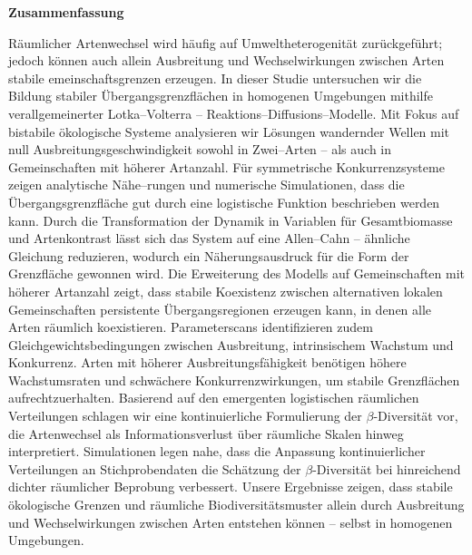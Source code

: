 \documentclass[12pt]{article}
\newenvironment{deabstract}
{
\clearpage
\thispagestyle{plain}
\begin{center}
\bfseries Zusammenfassung
\end{center}
}
{
\vfill\null
}
\begin{document}
\begin{deabstract}
Räumlicher Artenwechsel wird häufig auf Umweltheterogenität
zurückgeführt; jedoch können auch allein Ausbreitung und
Wechselwirkungen zwischen Arten stabile emeinschaftsgrenzen erzeugen. In dieser Studie untersuchen wir die Bildung stabiler Übergangsgrenzflächen in homogenen Umgebungen mithilfe verallgemeinerter Lotka--Volterra -- Reaktions--Diffusions--Modelle. Mit Fokus auf bistabile ökologische Systeme analysieren wir Lösungen wandernder Wellen mit null Ausbreitungsgeschwindigkeit sowohl in Zwei--Arten -- als auch in Gemeinschaften mit höherer Artanzahl. Für symmetrische Konkurrenzsysteme
zeigen analytische Nähe--rungen und numerische Simulationen, dass die Übergangsgrenzfläche gut durch eine logistische Funktion beschrieben werden kann. Durch die Transformation der Dynamik in Variablen für Gesamtbiomasse und Artenkontrast lässt sich das System auf eine
Allen--Cahn -- ähnliche Gleichung reduzieren, wodurch ein Näherungsausdruck für die Form der Grenzfläche gewonnen wird. Die Erweiterung des Modells auf Gemeinschaften mit höherer Artanzahl zeigt, dass stabile Koexistenz zwischen alternativen lokalen Gemeinschaften persistente Übergangsregionen erzeugen kann, in denen alle Arten räumlich koexistieren. Parameterscans identifizieren zudem
Gleichgewichtsbedingungen zwischen Ausbreitung, intrinsischem Wachstum und Konkurrenz. Arten mit höherer Ausbreitungsfähigkeit benötigen höhere Wachstumsraten und schwächere Konkurrenzwirkungen, um stabile
Grenzflächen aufrechtzuerhalten. Basierend auf den emergenten logistischen räumlichen Verteilungen schlagen wir eine kontinuierliche Formulierung der $\beta$-Diversität vor, die Artenwechsel als Informationsverlust über räumliche Skalen hinweg interpretiert. Simulationen legen nahe, dass die Anpassung kontinuierlicher Verteilungen an Stichprobendaten die Schätzung der $\beta$-Diversität bei hinreichend dichter räumlicher Beprobung verbessert. Unsere Ergebnisse zeigen, dass stabile ökologische Grenzen und räumliche Biodiversitätsmuster allein durch Ausbreitung und Wechselwirkungen zwischen Arten entstehen können -- selbst in homogenen Umgebungen.

\end{deabstract}

\newpage
\tableofcontents
\thispagestyle{empty}

\newpage
\setcounter{page}{1}


\newpage

\end{document}
